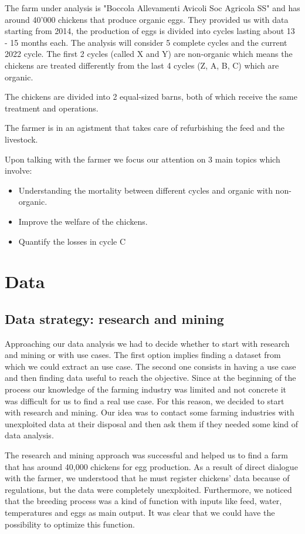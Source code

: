 \documentclass[11pt]{article}
\begin{document}
The farm under analysis is "Boccola Allevamenti Avicoli Soc Agricola SS" and has around 40'000 chickens that produce organic eggs. They provided us with data starting from 2014, the production of eggs is divided into cycles lasting about 13 - 15 months each. The analysis will consider 5 complete cycles and the current 2022 cycle. The first 2 cycles (called X and Y) are non-organic which means the chickens are treated differently from the last 4 cycles (Z, A, B, C) which are organic.

The chickens are divided into 2 equal-sized barns, both of which receive the same treatment and operations.

The farmer is in an agistment that takes care of refurbishing the feed and the livestock.

Upon talking with the farmer we focus our attention on 3 main topics which involve:
\begin{itemize}
    \item Understanding the mortality between different cycles and organic with non-organic.
    \item Improve the welfare of the chickens.
    \item Quantify the losses in cycle C
\end{itemize}

\section{Data}

\subsection{Data strategy: research and mining}

Approaching our data analysis we had to decide whether to start with research and mining or with use cases. The first option implies finding a dataset from which we could extract an use case.
The second one consists in having a use case and then finding data useful to reach the objective.
Since at the beginning of the process our knowledge of the farming industry was limited and not concrete it was difficult for us to find a real use case. For this reason, we decided to start with 
research and mining. Our idea was to contact some farming industries with unexploited data at their disposal and then ask them if they needed some kind of data analysis.

The research and mining approach was successful and helped us to find a farm that has around 40,000 chickens for egg production.
As a result of direct dialogue with the farmer, we understood that he must register chickens' data because of regulations, but the data were completely unexploited.
Furthermore, we noticed that the breeding process was a kind of function with inputs like feed, water, temperatures and eggs as main output.
It was clear that we could have the possibility to optimize this function.
\end{document}

